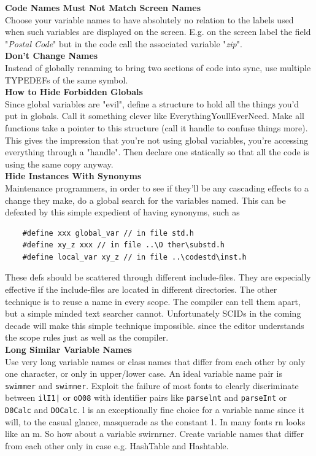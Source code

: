 \documentclass[11pt,twoside,a4paper]{article}
\begin{document}
\clearpage

\textbf{Code Names Must Not Match Screen Names}~\\
Choose your variable names to have absolutely no relation to the labels used when such variables are displayed on the screen. E.g. on the screen label the field "\emph{Postal Code}" but in the code call the associated variable "\emph{zip}".~\\ 

\textbf{Don't Change Names}~\\
Instead of globally renaming to bring two sections of code into sync, use multiple TYPEDEFs of the same symbol. ~\\

\textbf{How to Hide Forbidden Globals}~\\
Since global variables are "evil", define a structure to hold all the things you'd put in globals. Call it something clever like EverythingYoullEverNeed. Make all functions take a pointer to this structure (call it handle to confuse things more). This gives the impression that you're not using global variables, you're accessing everything through a "handle". Then declare one statically so that all the code is using the same copy anyway. ~\\

\textbf{Hide Instances With Synonyms}~\\
Maintenance programmers, in order to see if they'll be any cascading effects to a change they make, do a global search for the variables named. This can be defeated by this simple expedient of having synonyms, such as 
\begin{verbatim}
	#define xxx global_var // in file std.h 
	#define xy_z xxx // in file ..\O ther\substd.h 
	#define local_var xy_z // in file ..\codestd\inst.h
\end{verbatim} 
These defs should be scattered through different include-files. They are especially effective if the include-files are located in different directories. The other technique is to reuse a name in every scope. The compiler can tell them apart, but a simple minded text searcher cannot. Unfortunately SCIDs in the coming decade will make this simple technique impossible. since the editor understands the scope rules just as well as the compiler.~\\ 

\textbf{Long Similar Variable Names}~\\
Use very long variable names or class names that differ from each other by only one character, or only in upper/lower case. An ideal variable name pair is \texttt{swimmer} and \texttt{swimner}. Exploit the failure of most fonts to clearly discriminate between \texttt{ilI1|} or \texttt{oO08} with identifier pairs like \texttt{parselnt} and \texttt{parseInt} or \texttt{D0Calc} and \texttt{DOCalc}. l is an exceptionally fine choice for a variable name since it will, to the casual glance, masquerade as the constant 1. In many fonts rn looks like an m. So how about a variable swirnrner. Create variable names that differ from each other only in case e.g. HashTable and Hashtable.~\\ 
\end{document}
